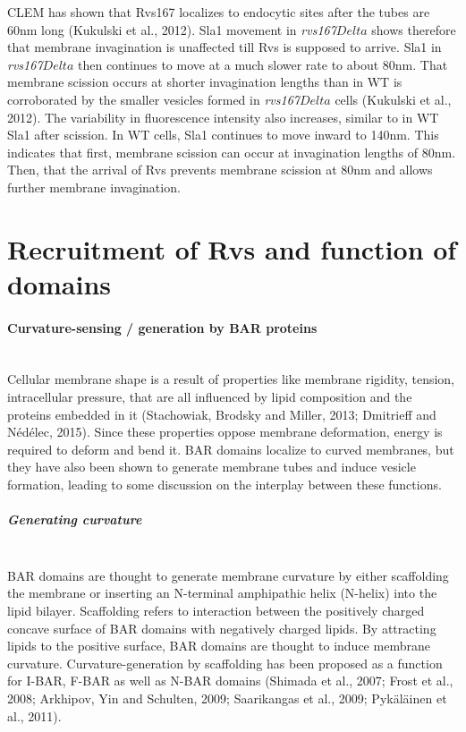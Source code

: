 \newpage
CLEM has shown that Rvs167 localizes to endocytic sites after the tubes are 60nm long (Kukulski et al., 2012). Sla1 movement in \textit{rvs167$Delta$} shows therefore that membrane invagination is unaffected till Rvs is supposed to arrive. Sla1 in \textit{rvs167$Delta$} then continues to move at a much slower rate to about 80nm. That membrane scission occurs at shorter invagination lengths than in WT is corroborated by the smaller vesicles formed in \textit{rvs167$Delta$} cells (Kukulski et al., 2012).  The variability in fluorescence intensity also increases, similar to in WT Sla1 after scission. In WT cells, Sla1 continues to move inward to 140nm. This indicates that first, membrane scission can occur at invagination lengths of 80nm. Then, that the arrival of Rvs prevents membrane scission at 80nm  and allows further membrane invagination. 





\section{Recruitment of Rvs and function of domains} 
\label{scaffolding_rvs}
	\paragraph{Curvature-sensing / generation by BAR proteins }
					\mbox{}\\
Cellular membrane shape is a result of properties like membrane rigidity, tension, intracellular pressure, that are all influenced by lipid composition and the proteins embedded in it (Stachowiak, Brodsky and Miller, 2013; Dmitrieff and Nédélec, 2015). Since these properties oppose membrane deformation, energy is required to deform and bend it. BAR domains localize to curved membranes, but they have also been shown to generate membrane tubes and induce vesicle formation, leading to some discussion on the interplay between these functions. 


	\vspace{5mm}
			
				\subparagraph{Generating curvature }
				\mbox{}\\
BAR domains are thought to generate membrane curvature by either scaffolding the membrane or inserting an N-terminal amphipathic helix (N-helix) into the lipid bilayer. 
Scaffolding refers to interaction between the positively charged concave surface of BAR domains with negatively charged lipids. By attracting lipids to the positive surface, BAR domains are thought to induce membrane curvature. Curvature-generation by scaffolding has been proposed as a function for I-BAR, F-BAR as well as N-BAR domains (Shimada et al., 2007; Frost et al., 2008; Arkhipov, Yin and Schulten, 2009; Saarikangas et al., 2009; Pykäläinen et al., 2011). 
	\vspace{5mm}
	
